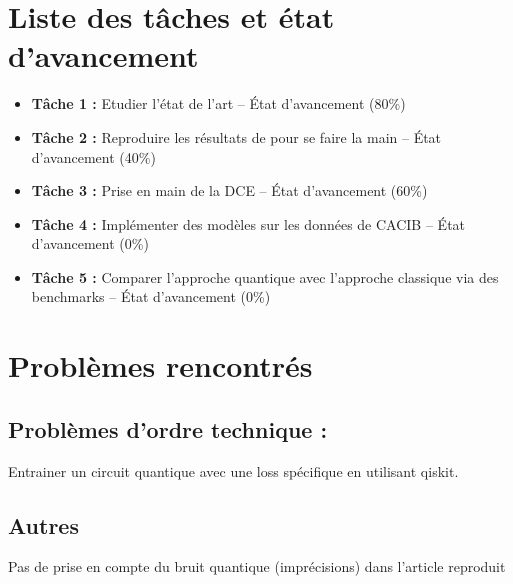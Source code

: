 \documentclass[11pt,a4paper]{article}
\begin{document}
\section{Liste des tâches et état d'avancement}

\begin{itemize}
    \item \textbf{Tâche 1 :} Etudier l'état de l'art -- État d'avancement (80\%)
    \item \textbf{Tâche 2 :} Reproduire les résultats de\cite{lloyd2020quantum} pour se faire la main -- État d'avancement (40\%)
    \item \textbf{Tâche 3 :} Prise en main de la DCE -- État d'avancement (60\%)
    \item \textbf{Tâche 4 :} Implémenter des modèles sur les données de CACIB -- État d'avancement (0\%)
    \item \textbf{Tâche 5 :} Comparer l'approche quantique avec l'approche classique via des benchmarks -- État d'avancement (0\%)
\end{itemize}

\section{Problèmes rencontrés}

\subsection*{Problèmes d'ordre technique : }
Entrainer un circuit quantique avec une loss spécifique en utilisant qiskit.

\subsection*{Autres}
Pas de prise en compte du bruit quantique (imprécisions) dans l'article reproduit



\end{document}
